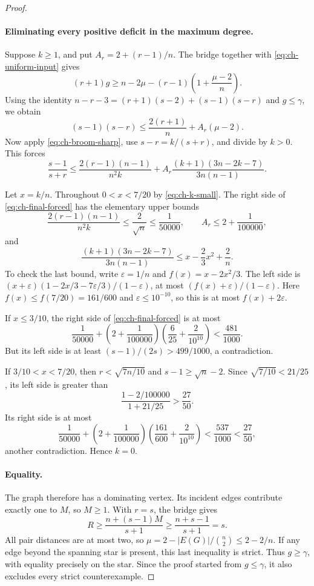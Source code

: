 \documentclass[11pt,a4paper]{article}
\theoremstyle{definition}
\theoremstyle{remark}
\numberwithin{equation}{section}
\begin{document}
\begin{proof}
\paragraph{Eliminating every positive deficit in the maximum degree.}
Suppose $k\ge1$, and put $A_r=2+(r-1)/n$. The bridge together with
\eqref{eq:ch-uniform-input} gives
\[
 (r+1)g\ge n-2\mu-(r-1)\left(1+\frac{\mu-2}{n}\right).
\]
Using the identity
$n-r-3=(r+1)(s-2)+(s-1)(s-r)$ and $g\le\gamma$, we obtain
\[
 (s-1)(s-r)\le\frac{2(r+1)}n+A_r(\mu-2).
\]
Now apply \eqref{eq:ch-broom-sharp}, use $s-r=k/(s+r)$, and divide by
$k>0$. This forces
\begin{equation}\label{eq:ch-final-forced}
 \frac{s-1}{s+r}
 \le\frac{2(r-1)(n-1)}{n^2k}
   +A_r\frac{(k+1)(3n-2k-7)}{3n(n-1)}.
\end{equation}

Let $x=k/n$. Throughout $0<x<7/20$ by \eqref{eq:ch-k-small}. The right
side of \eqref{eq:ch-final-forced} has the elementary upper bounds
\[
 \frac{2(r-1)(n-1)}{n^2k}\le\frac2{\sqrt n}\le\frac1{50000},
 \qquad A_r\le2+\frac1{100000},
\]
and
\begin{equation}\label{eq:ch-final-fraction}
 \frac{(k+1)(3n-2k-7)}{3n(n-1)}
 \le x-\frac23x^2+\frac2n.
\end{equation}
To check the last bound, write $\varepsilon=1/n$ and
$f(x)=x-2x^2/3$. The left side is
$(x+\varepsilon)(1-2x/3-7\varepsilon/3)/(1-\varepsilon)$,
at most $(f(x)+\varepsilon)/(1-\varepsilon)$.
Here $f(x)\le f(7/20)=161/600$ and $\varepsilon\le10^{-10}$, so this
is at most $f(x)+2\varepsilon$.

If $x\le3/10$, the right side of \eqref{eq:ch-final-forced} is at most
\[
 \frac1{50000}+
 \left(2+\frac1{100000}\right)
 \left(\frac6{25}+\frac2{10^{10}}\right)
 <\frac{481}{1000}.
\]
But its left side is at least $(s-1)/(2s)>499/1000$, a contradiction.

If $3/10<x<7/20$, then $r<\sqrt{7n/10}$ and $s-1\ge\sqrt n-2$.
Since $\sqrt{7/10}<21/25$, its left side is greater than
\[
 \frac{1-2/100000}{1+21/25}>\frac{27}{50}.
\]
Its right side is at most
\[
 \frac1{50000}+
 \left(2+\frac1{100000}\right)
 \left(\frac{161}{600}+\frac2{10^{10}}\right)
 <\frac{537}{1000}<\frac{27}{50},
\]
another contradiction. Hence $k=0$.

\paragraph{Equality.}
The graph therefore has a dominating vertex. Its incident edges contribute
exactly one to $M$, so $M\ge1$. With $r=s$, the bridge gives
\[
 R\ge\frac{n+(s-1)M}{s+1}
       \ge\frac{n+s-1}{s+1}=s.
\]
All pair distances are at most two, so
$\mu=2-|E(G)|/\binom n2\le2-2/n$. If any edge beyond the spanning star
is present, this last inequality is strict. Thus $g\ge\gamma$, with
equality precisely on the star. Since the proof started from $g\le\gamma$,
it also excludes every strict counterexample.
\end{proof}
\end{document}
